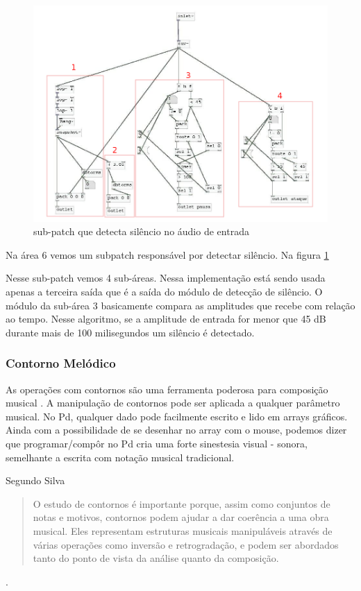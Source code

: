 \documentclass{ppgmus}
\begin{document}
\begin{figure}
\includegraphics[scale=.5]{sinc-audioanalise-detecta}
\caption{sub-patch que detecta silêncio no áudio de entrada}
\label{[sinc-audioanalise-detecta]}
\end{figure}




Na área 6 vemos um subpatch responsável por detectar
silêncio. Na figura \ref{[sinc-audioanalise-detecta]}


Nesse sub-patch vemos 4 sub-áreas. Nessa implementação
está sendo usada apenas a terceira saída que é a saída do
módulo de detecção de silêncio. O módulo da sub-área 3
basicamente compara as amplitudes que recebe com relação ao tempo.
Nesse algoritmo, se a amplitude de entrada for menor que 45 dB durante
mais de 100 milisegundos um silêncio é detectado.

\subsubsection{Contorno Melódico}
\label{contornos}


As operações com contornos são uma ferramenta poderosa para
composição musical \cite{sampaio08:torno}. A manipulação de contornos
pode ser aplicada a qualquer parâmetro musical.
No Pd, qualquer dado pode facilmente escrito e lido em arrays gráficos.
Ainda com a possibilidade de se desenhar no array com o mouse, podemos
dizer que programar/compôr no Pd cria uma
forte sinestesia visual - sonora, semelhante a escrita
com notação musical tradicional.

Segundo Silva \begin{quote}
               O estudo de contornos é importante porque, assim como conjuntos de notas e motivos,
               contornos podem ajudar a dar coerência a uma obra musical. Eles representam estruturas
		musicais manipuláveis através de várias operações como inversão e retrogradação, e podem
		ser abordados tanto do ponto de vista da análise quanto da composição.
              \end{quote} \cite{sampaio08:torno}.
\end{document}
